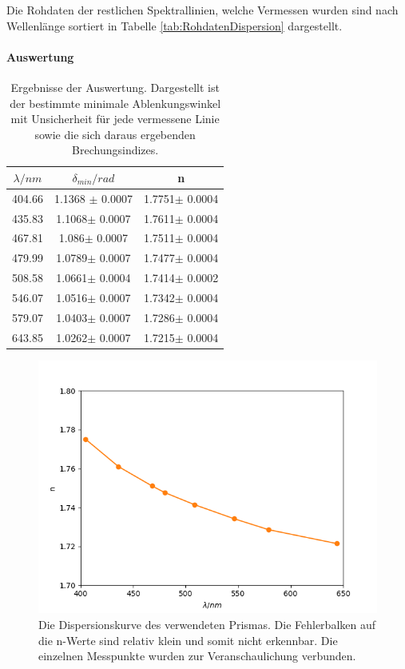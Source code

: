 \documentclass[12pt,a4paper]{article}
\begin{document}
	
	Die Rohdaten der restlichen Spektrallinien, welche Vermessen wurden sind nach Wellenlänge sortiert in Tabelle \ref{tab:RohdatenDispersion} dargestellt.
	
	
	\paragraph{Auswertung}
	
	\begin{table}
		\begin{center}
			\begin{tabular}{|c|c|c|}
				\hline
				$\lambda /nm$ & $\delta_{min} / rad$ & n \\
				\hline
				404.66 & 1.1368 $\pm$ 0.0007 & 1.7751$\pm$ 0.0004\\
				\hline
				435.83 & 1.1068$\pm$ 0.0007 & 1.7611$\pm$ 0.0004\\
				\hline
				467.81 & 1.086$\pm$ 0.0007 & 1.7511$\pm$ 0.0004\\
				\hline
				479.99 & 1.0789$\pm$ 0.0007&1.7477$\pm$ 0.0004\\
				\hline
				508.58 & 1.0661$\pm$ 0.0004 & 1.7414$\pm$ 0.0002\\
				\hline
				546.07 & 1.0516$\pm$ 0.0007 & 1.7342$\pm$ 0.0004\\
				\hline
				579.07 & 1.0403$\pm$ 0.0007 & 1.7286$\pm$ 0.0004\\
				\hline
				643.85 & 1.0262$\pm$ 0.0007 & 1.7215$\pm$ 0.0004\\
				\hline
			\end{tabular}
			\caption{Ergebnisse der Auswertung. Dargestellt ist der bestimmte minimale Ablenkungswinkel mit Unsicherheit für jede vermessene Linie sowie die sich daraus ergebenden Brechungsindizes.}
			\label{tab:AuswertungDispersion}
		\end{center}
	\end{table}
	
	\begin{figure}
		\includegraphics[scale=1.0]{Bilder/Dispersionskurve.png}
		\caption{Die Dispersionskurve des verwendeten Prismas. Die Fehlerbalken auf die n-Werte sind relativ klein und somit nicht erkennbar. Die einzelnen Messpunkte wurden zur Veranschaulichung verbunden.}\label{fig:Dispersionskurve}
	\end{figure}
	
\end{document}
